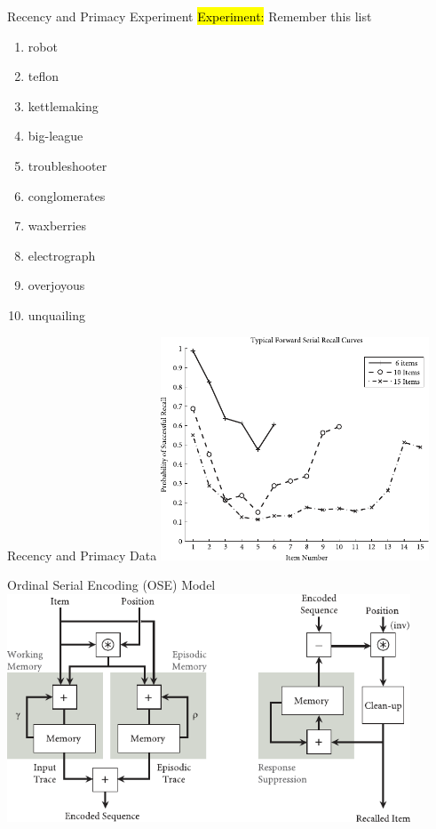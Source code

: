 \documentclass[handout,aspectratio=169]{beamer}
\begin{document}
	\begin{frame}{Recency and Primacy Experiment}
		\centering
		\Large
		\hl{Experiment:} Remember this list
		\begin{multicols}{2}
		\begin{enumerate}
			\centering
			\setlength{\itemsep}{0.25cm}
			\item<2,12> robot
			\item<3,12> teflon
			\item<4,12> kettlemaking
			\item<5,12> big-league
			\item<6,12> troubleshooter
			\item<7,12> conglomerates
			\item<8,12> waxberries
			\item<9,12> electrograph
			\item<10,12> overjoyous
			\item<11,12> unquailing
		\end{enumerate}
		\end{multicols}
	\end{frame}

	\begin{frame}{Recency and Primacy Data}
		\centering
		\includegraphics[width=0.6\textwidth]{media/htbab_recall_accuracy_jahnke.pdf}
	\end{frame}

	\begin{frame}{Ordinal Serial Encoding (OSE) Model}
		\centering
		\includegraphics[width=0.9\textwidth]{media/htbab_ose.pdf}
	\end{frame}
\end{document}
